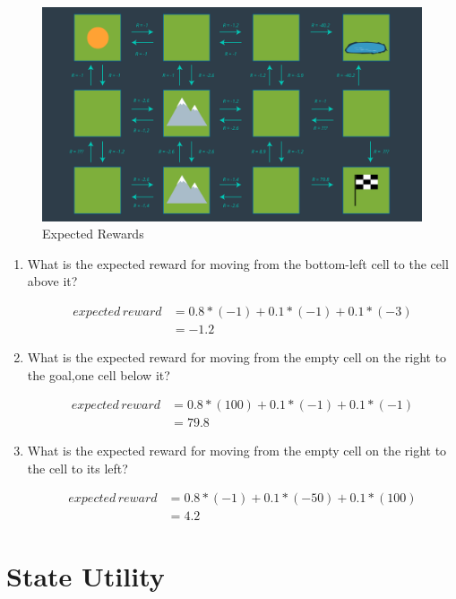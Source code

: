 \documentclass[10pt]{article}
\begin{document}
	\begin{figure}[h!]
		\includegraphics[width=\linewidth]{Images/mdp2.png}
		\caption{Expected Rewards}
	\end{figure}
	
\begin{enumerate}
	\item What is the expected reward for moving from the bottom-left cell to the cell above it?
	
	\begin{align*}
	expected\,reward &= 0.8 * (-1) + 0.1 * (-1) + 0.1 * (-3)\\
	&= -1.2
	\end{align*}
	
	\item What is the expected reward for moving from the empty cell on the right to the goal,one cell below it?
	
	\begin{align*}
	expected\,reward &= 0.8 * (100) + 0.1 * (-1) + 0.1 * (-1)\\
	&= 79.8
	\end{align*}
	
	\item What is the expected reward for moving from the empty cell on the right to the cell to its left?
	
	\begin{align*}
	expected\,reward &= 0.8 * (-1) + 0.1 * (-50) + 0.1 * (100)\\
	&= 4.2
	\end{align*}
	
\end{enumerate}

\section*{\normalsize State Utility}
\end{document}
